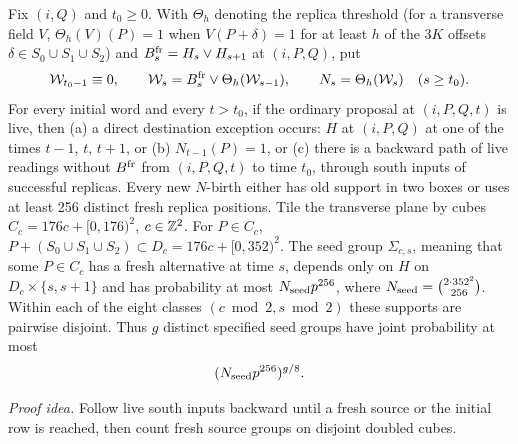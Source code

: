 \begin{lemma}\label{c:rare}
Fix \((i,Q)\) and \(t_0\ge0\). With \(\Theta_h\) denoting the
replica threshold (for a transverse field \(V\), \(\Theta_h(V)(P)=1\)
when \(V(P+\delta)=1\) for at least \(h\) of the \(3K\) offsets
\(\delta\in S_0\cup S_1\cup S_2\)) and \(B^{\rm fr}_s=H_s\lor H_{s+1}\) at \((i,P,Q)\), put
\[
 \mathcal W_{t_0-1}\equiv0,\qquad
 \mathcal W_s=B^{\rm fr}_s\lor\Theta_h(\mathcal W_{s-1}),\qquad
 N_s=\Theta_h(\mathcal W_s)\quad(s\ge t_0).
\]
For every initial word and every \(t>t_0\), if the ordinary proposal
at \((i,P,Q,t)\) is live, then (a) a direct destination exception
occurs: \(H\) at \((i,P,Q)\) at one of the times \(t-1\), \(t\), \(t+1\), or (b) \(N_{t-1}(P)=1\), or (c) there is a
backward path of live readings without \(B^{\rm fr}\) from \((i,P,Q,t)\)
to time \(t_0\), through south inputs of successful replicas.
Every new \(N\)-birth either has old support in two boxes or uses
at least 256 distinct fresh replica positions. Tile the transverse
plane by cubes \(C_c=176c+[0,176)^2\), \(c\in\mathbb Z^2\). For
\(P\in C_c\),
\(P+(S_0\cup S_1\cup S_2)\subset D_c=176c+[0,352)^2\).
The seed group \(\Sigma_{c,s}\), meaning that some \(P\in C_c\)
has a fresh alternative at time \(s\), depends only on \(H\) on
\(D_c\times\{s,s+1\}\) and has probability at most
\(N_{\rm seed}p^{256}\), where
\mbox{\(N_{\rm seed}=\tbinom{2\cdot352^2}{256}\)}.
Within each of the eight classes \((c\bmod2,s\bmod2)\) these supports
are pairwise disjoint. Thus \(g\) distinct specified seed groups
have joint probability at most
\begin{equation}\label{eq:c-rare}
 (N_{\rm seed}p^{256})^{g/8}.
\end{equation}
\end{lemma}
\par\noindent\emph{Proof idea.} Follow live south inputs backward until a fresh source or the initial row is reached, then count fresh source groups on disjoint doubled cubes.
